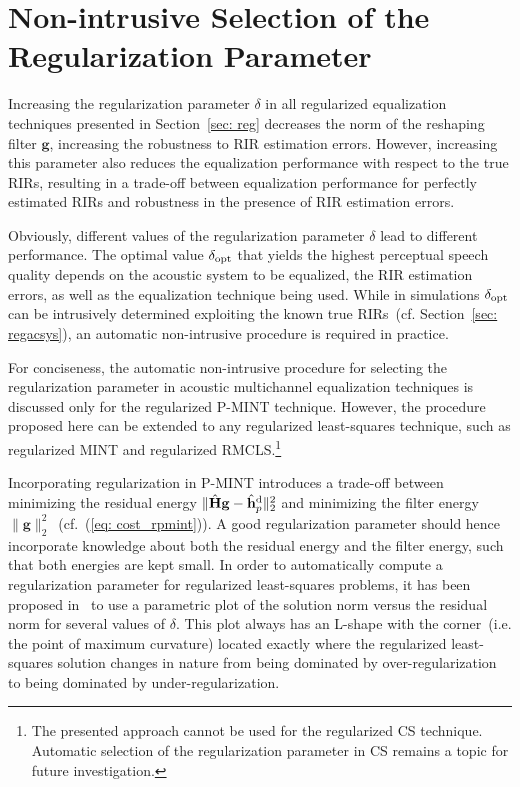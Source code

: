 \documentclass[10pt]{IEEEtran}
\begin{document}
\section{Non-intrusive Selection of the Regularization Parameter}
\label{sec: sel_reg}
Increasing the regularization parameter $\delta$ in all regularized equalization techniques presented in Section~\ref{sec: reg} decreases the norm of the reshaping filter $\mathbf{g}$, increasing the robustness to RIR estimation errors.
However, increasing this parameter also reduces the equalization performance with respect to the true RIRs, resulting in a trade-off between equalization performance for perfectly estimated RIRs and robustness in the presence of RIR estimation errors.

Obviously, different values of the regularization parameter $\delta$ lead to different performance.
The optimal value $\delta_{\rm opt}$ that yields the highest perceptual speech quality depends on the acoustic system to be equalized, the RIR estimation errors, as well as the equalization technique being used.
While in simulations $\delta_{\rm opt}$ can be intrusively determined exploiting the known true RIRs~(cf. Section~\ref{sec: regacsys}), an automatic non-intrusive procedure is required in practice.

For conciseness, the automatic non-intrusive procedure for selecting the regularization parameter in acoustic multichannel equalization techniques is discussed only for the regularized P-MINT technique.
However, the procedure proposed here can be extended to any regularized least-squares technique, such as regularized MINT and regularized RMCLS.\footnote{The presented approach cannot be used for the regularized CS technique. Automatic selection of the regularization parameter in CS remains a topic for future investigation.}

Incorporating regularization in P-MINT introduces a trade-off between minimizing the residual energy $\|\hat{\mathbf{H}}\mathbf{g} - \hat{\mathbf{h}}_p^{\rm d} \|_2^2$ and minimizing the filter energy $\|\mathbf{g}\|_2^2$~(cf.~(\ref{eq: cost_rpmint})).
A good regularization parameter should hence incorporate knowledge about both the residual energy and the filter energy, such that both energies are kept small.
In order to automatically compute a regularization parameter for regularized least-squares problems, it has been proposed in~\cite{Hansen_1993} to use a parametric plot of the solution norm versus the residual norm for several values of $\delta$.
This plot always has an L-shape with the corner~(i.e. the point of maximum curvature) located exactly where the regularized least-squares solution changes in nature from being dominated by over-regularization to being dominated by under-regularization.
\end{document}

